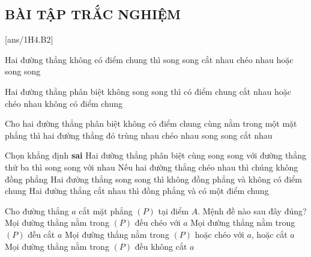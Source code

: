 \subsection{BÀI TẬP TRẮC NGHIỆM}
[ans/1H4.B2]
\setcounter{ex}{0}

\begin{ex}%
	Hai đường thẳng không có điểm chung thì
	{song song}
	{cắt nhau}
	{\True chéo nhau hoặc song song}
\end{ex}

\begin{ex}%
	Hai đường thẳng phân biệt không song song thì
	{có điểm chung}
	{\True cắt nhau hoặc chéo nhau}
	{ không có điểm chung}
\end{ex}

\begin{ex}%
	Cho hai đường thẳng phân biệt không có điểm chung cùng nằm trong một mặt phẳng thì hai đường thẳng đó
	\choice
	{trùng nhau}
	{chéo nhau}
	{\True song song}
	{cắt nhau}
\end{ex}

\begin{ex}%
	Chọn khẳng định {\bf sai}
	\choice
	{Hai đường thẳng phân biệt cùng song song với đường thẳng thứ ba thì song song với nhau}
	{Nếu hai đường thẳng chéo nhau thì chúng không đồng phẳng}
	{\True Hai đường thẳng song song thì không đồng phẳng và không có điểm chung}
	{Hai đường thẳng cắt nhau thì đồng phẳng và có một điểm chung}
\end{ex}

\begin{ex}%
	Cho đường thẳng $a$ cắt mặt phẳng $(P)$ tại điểm $A$. Mệnh đề nào sau đây đúng?
	\choice
	{Mọi đường thẳng nằm trong $(P)$ đều chéo với $a$}
	{Mọi đường thẳng nằm trong $(P)$ đều cắt $a$}
	{\True Mọi đường thẳng nằm trong $(P)$ hoặc chéo với $a$, hoặc cắt $a$}
	{Mọi đường thẳng nằm trong $(P)$ đều không cắt $a$}
\end{ex}

